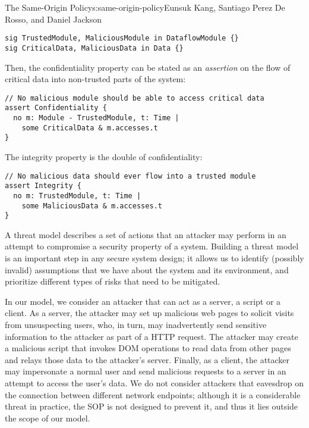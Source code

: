 \begin{aosachapter}{The Same-Origin Policy}{s:same-origin-policy}{Eunsuk Kang, Santiago Perez De Rosso, and Daniel Jackson}
\begin{verbatim}
sig TrustedModule, MaliciousModule in DataflowModule {}
sig CriticalData, MaliciousData in Data {}
\end{verbatim}

Then, the confidentiality property can be stated as an \emph{assertion}
on the flow of critical data into non-trusted parts of the system:

\begin{verbatim}
// No malicious module should be able to access critical data
assert Confidentiality {
  no m: Module - TrustedModule, t: Time |
    some CriticalData & m.accesses.t 
}
\end{verbatim}

The integrity property is the double of confidentiality:

\begin{verbatim}
// No malicious data should ever flow into a trusted module
assert Integrity {
  no m: TrustedModule, t: Time | 
    some MaliciousData & m.accesses.t
}
\end{verbatim}

\label{threat-model}

A threat model describes a set of actions that an attacker may perform
in an attempt to compromise a security property of a system. Building a
threat model is an important step in any secure system design; it allows
us to identify (possibly invalid) assumptions that we have about the
system and its environment, and prioritize different types of risks that
need to be mitigated.

In our model, we consider an attacker that can act as a server, a script
or a client. As a server, the attacker may set up malicious web pages to
solicit visits from unsuspecting users, who, in turn, may inadvertently
send sensitive information to the attacker as part of a HTTP request.
The attacker may create a malicious script that invokes DOM operations
to read data from other pages and relays those data to the attacker's
server. Finally, as a client, the attacker may impersonate a normal user
and send malicious requests to a server in an attempt to access the
user's data. We do not consider attackers that eavesdrop on the
connection between different network endpoints; although it is a
considerable threat in practice, the SOP is not designed to prevent it,
and thus it lies outside the scope of our model.

\label{checking-properties}


\end{aosachapter}
